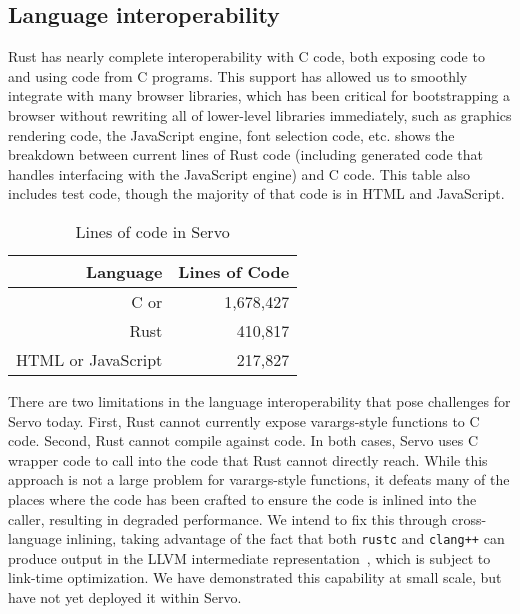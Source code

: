 \subsection{Language interoperability}
Rust has nearly complete interoperability with C code, both exposing code to and using code from
C programs.
This support has allowed us to smoothly integrate with many browser libraries, which has been
critical for bootstrapping a browser without rewriting all of lower-level libraries immediately, such as
graphics rendering code, the JavaScript engine, font selection code, etc.
 shows the breakdown between current lines of Rust code (including generated code that
handles interfacing with the JavaScript engine) and C code.
This table also includes test code, though the majority of that code is in HTML and JavaScript.
\begin{table}
  \begin{center}
    \begin{tabular}{r || r}
      Language & Lines of Code \\
      \hline
      C or \Cplusplus{} & 1,678,427 \\
      Rust & 410,817 \\
      HTML or JavaScript & 217,827 \\
    \end{tabular}%
  \end{center}%
  \caption{Lines of code in Servo}
  \label{servo-loc}
\end{table}

There are two limitations in the language interoperability that pose challenges for Servo today.
First, Rust cannot currently expose varargs-style functions to C code.
Second, Rust cannot compile against \Cplusplus{} code.
In both cases, Servo uses C wrapper code to call into the code that Rust cannot directly
reach.
While this approach is not a large problem for varargs-style functions, it defeats many of the
places where the \Cplusplus{} code has been crafted to ensure the code is inlined into the caller,
resulting in degraded performance. We intend to fix this through cross-language inlining, taking
advantage of the fact that both \lstinline{rustc} and \lstinline{clang++} can produce output in the
LLVM intermediate representation~\cite{LLVM}, which is subject to link-time optimization. We have
demonstrated this capability at small scale, but have not yet deployed it within Servo.

